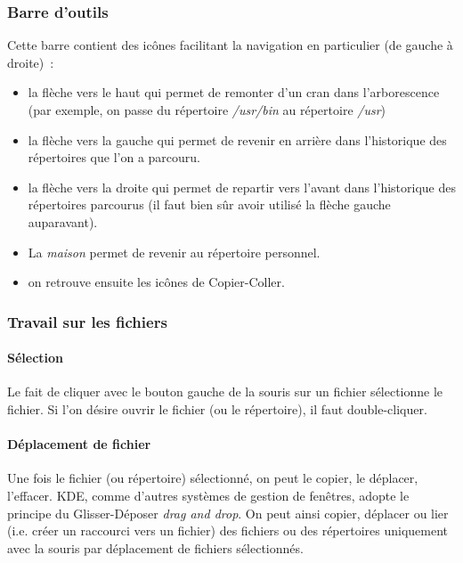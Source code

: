 \documentclass[12pt,a4paper]{article}
\begin{document}
\subsubsection{Barre d'outils}
   Cette barre contient des icônes facilitant la navigation en
   particulier (de gauche à droite)~:
 
   \begin{itemize}
   \item la flèche vers le haut qui permet de remonter d'un cran
     dans l'arborescence (par exemple, on passe du répertoire
     \emph{/usr/bin} au répertoire \emph{/usr})

   \item la flèche vers la gauche qui permet de revenir en arrière
     dans l'historique des répertoires que l'on a parcouru.

   \item la flèche vers la droite qui permet de repartir vers l'avant
     dans l'historique des répertoires parcourus (il faut bien sûr
     avoir utilisé la flèche gauche auparavant). 

   \item La \emph{maison} permet de revenir au répertoire personnel.

   \item on retrouve ensuite les icônes de Copier-Coller.
   \end{itemize}


\subsubsection{Travail sur les fichiers}

\paragraph{Sélection\\}
Le fait de cliquer avec le bouton gauche de la souris sur un fichier
sélectionne le fichier. Si l'on désire ouvrir le fichier (ou le
répertoire), il faut double-cliquer.

\paragraph{Déplacement de fichier\\}
Une fois le fichier (ou répertoire) sélectionné, on peut le copier,
le déplacer, l'effacer. KDE, comme d'autres systèmes de gestion de
fenêtres, adopte le principe du Glisser-Déposer \emph{drag and
  drop}. On peut ainsi copier, déplacer ou lier (i.e. créer un
raccourci vers un fichier) des fichiers ou des répertoires uniquement
avec la souris par déplacement de fichiers sélectionnés.
\end{document}
